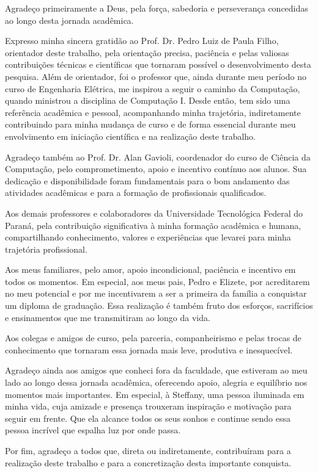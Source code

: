 
\begin{agradecimentos}%

Agradeço primeiramente a Deus, pela força, sabedoria e perseverança concedidas ao longo desta jornada acadêmica.

Expresso minha sincera gratidão ao Prof. Dr. Pedro Luiz de Paula Filho, orientador deste trabalho, pela orientação precisa, paciência e pelas valiosas contribuições técnicas e científicas que tornaram possível o desenvolvimento desta pesquisa. Além de orientador, foi o professor que, ainda durante meu período no curso de Engenharia Elétrica, me inspirou a seguir o caminho da Computação, quando ministrou a disciplina de Computação I. Desde então, tem sido uma referência acadêmica e pessoal, acompanhando minha trajetória,  indiretamente contribuindo para minha mudança de curso e de forma essencial durante meu envolvimento em iniciação científica e na realização deste trabalho.

Agradeço também ao Prof. Dr. Alan Gavioli, coordenador do curso de Ciência da Computação, pelo comprometimento, apoio e incentivo contínuo aos alunos. Sua dedicação e disponibilidade foram fundamentais para o bom andamento das atividades acadêmicas e para a formação de profissionais qualificados.

Aos demais professores e colaboradores da Universidade Tecnológica Federal do Paraná, pela contribuição significativa à minha formação acadêmica e humana, compartilhando conhecimento, valores e experiências que levarei para minha trajetória profissional.

Aos meus familiares, pelo amor, apoio incondicional, paciência e incentivo em todos os momentos. Em especial, aos meus pais, Pedro e Elizete, por acreditarem no meu potencial e por me incentivarem a ser a primeira da família a conquistar um diploma de graduação. Essa realização é também fruto dos esforços, sacrifícios e ensinamentos que me transmitiram ao longo da vida.

Aos colegas e amigos de curso, pela parceria, companheirismo e pelas trocas de conhecimento que tornaram essa jornada mais leve, produtiva e inesquecível.

Agradeço ainda aos amigos que conheci fora da faculdade, que estiveram ao meu lado ao longo dessa jornada acadêmica, oferecendo apoio, alegria e equilíbrio nos momentos mais importantes. Em especial, à Steffany, uma pessoa iluminada em minha vida, cuja amizade e presença trouxeram inspiração e motivação para seguir em frente. Que ela alcance todos os seus sonhos e continue sendo essa pessoa incrível que espalha luz por onde passa.

Por fim, agradeço a todos que, direta ou indiretamente, contribuíram para a realização deste trabalho e para a concretização desta importante conquista.


\end{agradecimentos}
